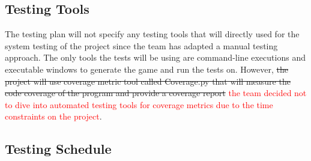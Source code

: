\documentclass[12pt, titlepage]{article}
\begin{document}
\subsection{Testing Tools}

The testing plan will not specify any testing tools that will directly used for the system testing of the project since the team has adapted a manual testing approach. The only tools the tests will be using are command-line executions and executable windows to generate the game and run the tests on. However, \st{the project will use coverage metric tool called Coverage.py that will measure the code coverage of the program and provide a coverage report} \textcolor{red}{the team decided not to dive into automated testing tools for coverage metrics due to the time constraints on the project}. 

\subsection{Testing Schedule}
		
\end{document}
